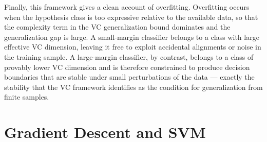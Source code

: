 Finally, this framework gives a clean account of overfitting. Overfitting occurs when the
hypothesis class is too expressive relative to the available data, so that the complexity
term in the VC generalization bound dominates and the generalization gap is large. A small-margin
classifier belongs to a class with large effective VC dimension, leaving it free to exploit
accidental alignments or noise in the training sample. A large-margin classifier, by
contrast, belongs to a class of provably lower VC dimension and is therefore constrained to
produce decision boundaries that are stable under small perturbations of the data --- exactly
the stability that the VC framework identifies as the condition for generalization from finite
samples.

\section{Gradient Descent and  SVM}

